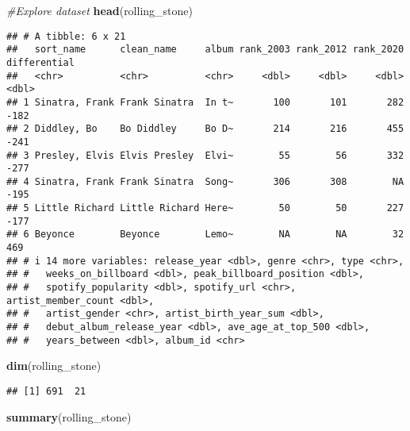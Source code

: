 \documentclass[
]{article}
\newenvironment{Shaded}{\begin{snugshade}}{\end{snugshade}}
\newcommand{\CommentTok}[1]{\textcolor[rgb]{0.56,0.35,0.01}{\textit{#1}}}
\newcommand{\FunctionTok}[1]{\textcolor[rgb]{0.13,0.29,0.53}{\textbf{#1}}}
\newcommand{\NormalTok}[1]{#1}
\begin{document}
\begin{Shaded}
\begin{Highlighting}[]
\CommentTok{\#Explore dataset}
\FunctionTok{head}\NormalTok{(rolling\_stone)}
\end{Highlighting}
\end{Shaded}

\begin{verbatim}
## # A tibble: 6 x 21
##   sort_name      clean_name     album rank_2003 rank_2012 rank_2020 differential
##   <chr>          <chr>          <chr>     <dbl>     <dbl>     <dbl>        <dbl>
## 1 Sinatra, Frank Frank Sinatra  In t~       100       101       282         -182
## 2 Diddley, Bo    Bo Diddley     Bo D~       214       216       455         -241
## 3 Presley, Elvis Elvis Presley  Elvi~        55        56       332         -277
## 4 Sinatra, Frank Frank Sinatra  Song~       306       308        NA         -195
## 5 Little Richard Little Richard Here~        50        50       227         -177
## 6 Beyonce        Beyonce        Lemo~        NA        NA        32          469
## # i 14 more variables: release_year <dbl>, genre <chr>, type <chr>,
## #   weeks_on_billboard <dbl>, peak_billboard_position <dbl>,
## #   spotify_popularity <dbl>, spotify_url <chr>, artist_member_count <dbl>,
## #   artist_gender <chr>, artist_birth_year_sum <dbl>,
## #   debut_album_release_year <dbl>, ave_age_at_top_500 <dbl>,
## #   years_between <dbl>, album_id <chr>
\end{verbatim}

\begin{Shaded}
\begin{Highlighting}[]
\FunctionTok{dim}\NormalTok{(rolling\_stone)}
\end{Highlighting}
\end{Shaded}

\begin{verbatim}
## [1] 691  21
\end{verbatim}

\begin{Shaded}
\begin{Highlighting}[]
\FunctionTok{summary}\NormalTok{(rolling\_stone)}
\end{Highlighting}
\end{Shaded}
\end{document}
